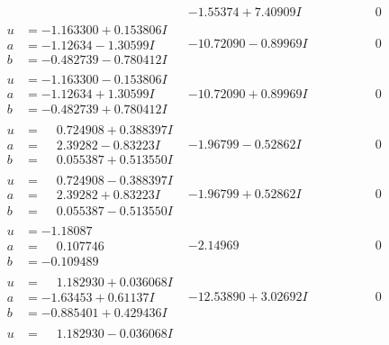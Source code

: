 \documentclass[1p]{elsarticle_modified}
\theoremstyle{definition}
\begin{document}
$$\begin{array}{c|c|c}
 & -1.55374 + 7.40909 I & \phantom{-0.000000 } 0 \\ \hline\begin{aligned}
u &= -1.163300 + 0.153806 I \\
a &= -1.12634 - 1.30599 I \\
b &= -0.482739 - 0.780412 I\end{aligned}
 & -10.72090 - 0.89969 I & \phantom{-0.000000 } 0 \\ \hline\begin{aligned}
u &= -1.163300 - 0.153806 I \\
a &= -1.12634 + 1.30599 I \\
b &= -0.482739 + 0.780412 I\end{aligned}
 & -10.72090 + 0.89969 I & \phantom{-0.000000 } 0 \\ \hline\begin{aligned}
u &= \phantom{-}0.724908 + 0.388397 I \\
a &= \phantom{-}2.39282 - 0.83223 I \\
b &= \phantom{-}0.055387 + 0.513550 I\end{aligned}
 & -1.96799 - 0.52862 I & \phantom{-0.000000 } 0 \\ \hline\begin{aligned}
u &= \phantom{-}0.724908 - 0.388397 I \\
a &= \phantom{-}2.39282 + 0.83223 I \\
b &= \phantom{-}0.055387 - 0.513550 I\end{aligned}
 & -1.96799 + 0.52862 I & \phantom{-0.000000 } 0 \\ \hline\begin{aligned}
u &= -1.18087\phantom{ +0.000000I} \\
a &= \phantom{-}0.107746\phantom{ +0.000000I} \\
b &= -0.109489\phantom{ +0.000000I}\end{aligned}
 & -2.14969\phantom{ +0.000000I} & \phantom{-0.000000 } 0 \\ \hline\begin{aligned}
u &= \phantom{-}1.182930 + 0.036068 I \\
a &= -1.63453 + 0.61137 I \\
b &= -0.885401 + 0.429436 I\end{aligned}
 & -12.53890 + 3.02692 I & \phantom{-0.000000 } 0 \\ \hline\begin{aligned}
u &= \phantom{-}1.182930 - 0.036068 I \\

\end{aligned}
\end{array}$$
\end{document}

